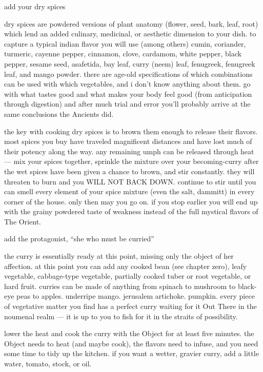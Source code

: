 \begin{algorithm}
  \item add your dry spices

  dry spices are powdered versions of plant anatomy (flower, seed, bark, leaf, 
  root) which lend an added culinary, medicinal, or aesthetic dimension to your 
  dish. to capture a typical indian flavor you will use (among others) cumin, 
  coriander, turmeric, cayenne pepper, cinnamon, clove, cardamom, white pepper, 
  black pepper, sesame seed, asafetida, bay leaf, curry (neem) leaf, fenugreek, 
  fenugreek leaf, and mango powder. there are age-old specifications of which 
  combinations can be used with which vegetables, and i don't know anything 
  about them. go with what tastes good and what makes your body feel good (from 
  anticipation through digestion) and after much trial and error you'll 
  probably arrive at the same conclusions the Ancients did.

  the key with cooking dry spices is to brown them enough to release their 
  flavors. most spices you buy have traveled magnificent distances and have 
  lost much of their potency along the way. any remaining umph can be released 
  through heat --- mix your spices together, sprinkle the mixture over your 
  becoming-curry after the wet spices have been given a chance to brown, and 
  stir constantly. they will threaten to burn and you WILL NOT BACK DOWN. 
  continue to stir until you can smell every element of your spice mixture 
  (even the salt, dammitt) in every corner of the house. only then may you go 
  on. if you stop earlier you will end up with the grainy powdered taste of 
  weakness instead of the full mystical flavors of The Orient.

  \item add the protagonist, ``she who must be curried''

  the curry is essentially ready at this point, missing only the object of her 
  affection. at this point you can add any cooked bean (see chapter zero), 
  leafy vegetable, cabbage-type vegetable, partially cooked tuber or root 
  vegetable, or hard fruit. curries can be made of anything from spinach to 
  mushroom to black-eye peas to apples. underripe mango. jerusalem artichoke. 
  pumpkin. every piece of vegetative matter you find has a perfect curry 
  waiting for it Out There in the noumenal realm --- it is up to you to fish 
  for it in the straits of possibility.
  
  lower the heat and cook the curry with the Object for at least five minutes. 
  the Object needs to heat (and maybe cook), the flavors need to infuse, and 
  you need some time to tidy up the kitchen. if you want a wetter, gravier 
  curry, add a little water, tomato, stock, or oil.


\end{algorithm}

